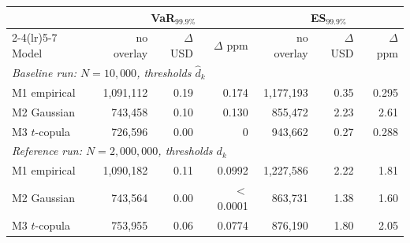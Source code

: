 \begin{tabular}{lrrrrrr}
\toprule
 & \multicolumn{3}{c}{VaR$_{99.9\%}$} & \multicolumn{3}{c}{ES$_{99.9\%}$} \\
\cmidrule(lr){2-4}\cmidrule(lr){5-7}
Model & no overlay & $\Delta$ USD & $\Delta$ ppm & no overlay & $\Delta$ USD & $\Delta$ ppm \\
\midrule
\multicolumn{7}{l}{\emph{Baseline run: $N=10{,}000$, thresholds $\hat d_k$}} \\
M1 empirical & 1,091,112 & 0.19 & 0.174 & 1,177,193 & 0.35 & 0.295 \\
M2 Gaussian & 743,458 & 0.10 & 0.130 & 855,472 & 2.23 & 2.61 \\
M3 $t$-copula & 726,596 & 0.00 & 0 & 943,662 & 0.27 & 0.288 \\
\midrule
\multicolumn{7}{l}{\emph{Reference run: $N=2{,}000{,}000$, thresholds $d_k$}} \\
M1 empirical & 1,090,182 & 0.11 & 0.0992 & 1,227,586 & 2.22 & 1.81 \\
M2 Gaussian & 743,564 & 0.00 & $<$0.0001 & 863,731 & 1.38 & 1.60 \\
M3 $t$-copula & 753,955 & 0.06 & 0.0774 & 876,190 & 1.80 & 2.05 \\
\bottomrule
\end{tabular}
